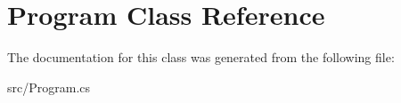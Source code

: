 \hypertarget{class_program}{}\section{Program Class Reference}
\label{class_program}


The documentation for this class was generated from the following file\+:\begin{DoxyCompactItemize}
\item 
src/Program.\+cs\end{DoxyCompactItemize}
